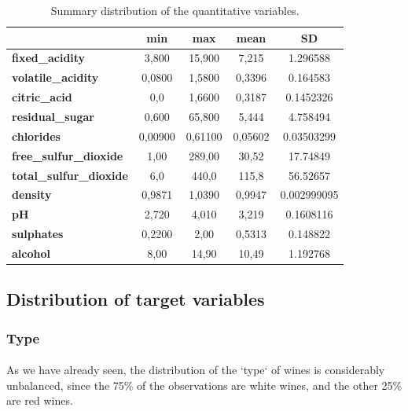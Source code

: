 \documentclass[10pt]{article}
\begin{document}
\begin{table}[h]
	\centering
	\begin{tabular}{|l|c|c|c|c|}
		\hline
		& \textbf{min} & \textbf{max} & \textbf{mean} & \textbf{SD} \\ \hline
		\textbf{fixed\_acidity} & 3,800 & 15,900 & 7,215 & 1.296588 \\ \hline
		\textbf{volatile\_acidity} & 0,0800 & 1,5800 & 0,3396 & 0.164583 \\ \hline
		\textbf{citric\_acid} & 0,0 & 1,6600 & 0,3187 & 0.1452326 \\ \hline
		\textbf{residual\_sugar} & 0,600 & 65,800 & 5,444 & 4.758494 \\ \hline
		\textbf{chlorides} & 0,00900 & 0,61100 & 0,05602 & 0.03503299 \\ \hline
		\textbf{free\_sulfur\_dioxide} & 1,00 & 289,00 & 30,52 & 17.74849 \\ \hline
		\textbf{total\_sulfur\_dioxide} & 6,0 & 440,0 & 115,8 & 56.52657 \\ \hline
		\textbf{density} & 0,9871 & 1,0390 & 0,9947 & 0.002999095 \\ \hline
		\textbf{pH} & 2,720 & 4,010 & 3,219 & 0.1608116 \\ \hline
		\textbf{sulphates} & 0,2200 & 2,00 & 0,5313 & 0.148822 \\ \hline
		\textbf{alcohol} & 8,00 & 14,90 & 10,49 & 1.192768 \\ \hline
	\end{tabular}%
	\caption{Summary distribution of the quantitative variables.}
	\label{table:variables}
\end{table}

\subsection{Distribution of target variables}
\subsubsection{Type}

\paragraph*{}
As we have already seen, the distribution of the `type` of wines is considerably unbalanced, since the 75\% of the observations are white wines, and the other 25\% are red wines.
\end{document}
